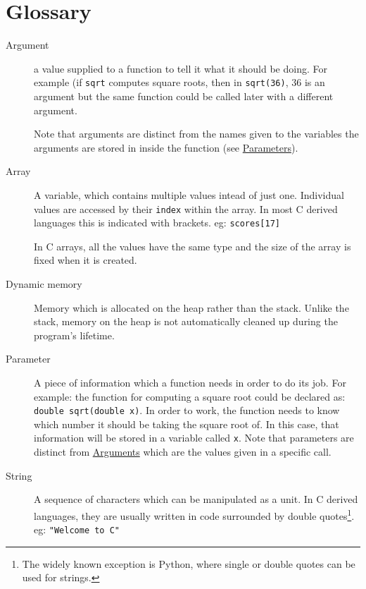 
\chapter*{Glossary}

\begin{description}
 \item[\hypertarget{defn:argument}{Argument}] a value supplied to a function to tell it what it should be doing.
 For example (if \texttt{sqrt} computes square roots, then in \lstinline{sqrt(36)}, $36$ is an argument but the same function
 could be called later with a different argument.
 
 Note that arguments are distinct from the names given to the variables the arguments are stored in inside the function (see \hyperlink{defn:parameter}{Parameters}).
 
 \item[\hypertarget{defn:array}{Array}] A variable, which contains multiple values intead of just one. 
 Individual values are accessed by their \texttt{index} within the array.
 In most C derived languages this is indicated with brackets.
 eg:
    \lstinline!scores[17]!
    
 In C arrays, all the values have the same type and the size of the array is fixed 
 when it is created.
 
 \item [\hypertarget{defn:dynamicmemory}{Dynamic memory}] Memory which is allocated on the heap rather than the stack.
 Unlike the stack, memory on the heap is not automatically cleaned up during the program's lifetime.
 
 \item[\hypertarget{defn:parameter}{Parameter}] A piece of information which a function needs in order to do its job.
 For example: the function for computing a square root could be declared as:
 \lstinline!double sqrt(double x)!.
 In order to work, the function needs to know which number it should be taking the square root of.
 In this case, that information will be stored in a variable called \texttt{x}.
 Note that parameters are distinct from \hyperlink{defn:argument}{Arguments} which are the values given in a specific call.
 
 \item[\hypertarget{defn:string}{String}] A sequence of characters which can be manipulated as a unit.
 In C derived languages, they are usually written in code surrounded by double quotes\footnote{The widely known exception 
 is Python, where single or double quotes can be used for strings.}.
 eg:
 \lstinline!"Welcome to C"!
\end{description}
